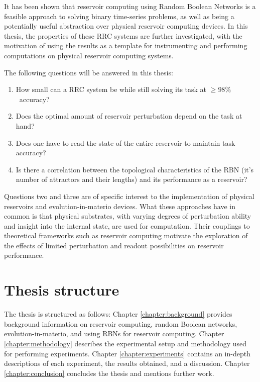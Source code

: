 It has been shown that reservoir computing using Random Boolean Networks is a feasible approach to solving binary time-series problems,
as well as being a potentially useful abstraction over physical reservoir computing devices.
In this thesis, the properties of these RRC systems are further investigated,
with the motivation of using the results as a template for instrumenting and performing computations on physical reservoir computing systems.

The following questions will be answered in this thesis:
\begin{enumerate}
    \item How small can a RRC system be while still solving its task at $ \geq 98\% $ accuracy?
    \item Does the optimal amount of reservoir perturbation depend on the task at hand?
    \item Does one have to read the state of the entire reservoir to maintain task accuracy?
    \item Is there a correlation between the topological characteristics of the RBN (it's number of attractors and their lengths) and its performance as a reservoir?
\end{enumerate}

Questions two and three are of specific interest to the implementation of physical reservoirs and evolution-in-materio devices.
What these approaches have in common is that physical substrates,
with varying degrees of perturbation ability and insight into the internal state,
are used for computation.
Their couplings to theoretical frameworks such as reservoir computing motivate the exploration of the effects of limited perturbation and readout possibilities on reservoir performance.

\section{Thesis structure}

The thesis is structured as follows:
Chapter \ref{chapter:background} provides background information on reservoir computing, random Boolean networks, evolution-in-materio, and using RBNs for reservoir computing.
Chapter \ref{chapter:methodology} describes the experimental setup and methodology used for performing experiments.
Chapter \ref{chapter:experiments} contains an in-depth descriptions of each experiment, the results obtained, and a discussion.
Chapter \ref{chapter:conclusion} concludes the thesis and mentions further work.
